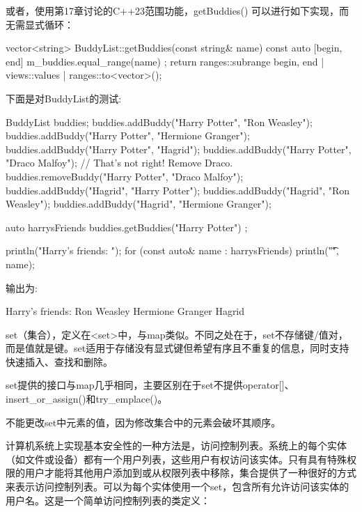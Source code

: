 或者，使用第17章讨论的C++23范围功能，getBuddies() 可以进行如下实现，而无需显式循环：

\begin{cpp}
vector<string> BuddyList::getBuddies(const string& name) const
{
    auto [begin, end] { m_buddies.equal_range(name) };
    return ranges::subrange { begin, end } | views::values | ranges::to<vector>();
}
\end{cpp}

下面是对BuddyList的测试:

\begin{cpp}
BuddyList buddies;
buddies.addBuddy("Harry Potter", "Ron Weasley");
buddies.addBuddy("Harry Potter", "Hermione Granger");
buddies.addBuddy("Harry Potter", "Hagrid");
buddies.addBuddy("Harry Potter", "Draco Malfoy");
// That's not right! Remove Draco.
buddies.removeBuddy("Harry Potter", "Draco Malfoy");
buddies.addBuddy("Hagrid", "Harry Potter");
buddies.addBuddy("Hagrid", "Ron Weasley");
buddies.addBuddy("Hagrid", "Hermione Granger");

auto harrysFriends { buddies.getBuddies("Harry Potter") };

println("Harry's friends: ");
for (const auto& name : harrysFriends) {
    println("\t{}", name);
}
\end{cpp}

输出为:

\begin{shell}
Harry's friends:
        Ron Weasley
        Hermione Granger
        Hagrid
\end{shell}


set（集合），定义在<set>中，与map类似。不同之处在于，set不存储键/值对，而是值就是键。set适用于存储没有显式键但希望有序且不重复的信息，同时支持快速插入、查找和删除。

set提供的接口与map几乎相同，主要区别在于set不提供operator[]、insert\_or\_assign()和try\_emplace()。

不能更改set中元素的值，因为修改集合中的元素会破坏其顺序。


计算机系统上实现基本安全性的一种方法是，访问控制列表。系统上的每个实体（如文件或设备）都有一个用户列表，这些用户有权访问该实体。只有具有特殊权限的用户才能将其他用户添加到或从权限列表中移除，集合提供了一种很好的方式来表示访问控制列表。可以为每个实体使用一个set，包含所有允许访问该实体的用户名。这是一个简单访问控制列表的类定义：

